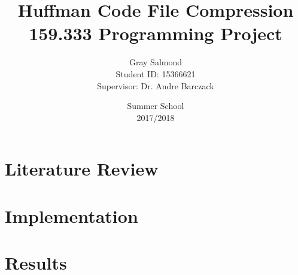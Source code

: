 \documentclass{report}
\title{Huffman Code File Compression\\159.333 Programming Project}
\date{Summer School\\2017/2018}
\author{Gray Salmond\\ Student ID: 15366621\\
Supervisor: Dr. Andre Barczack}
\begin{document}
\maketitle	
{}	
\newpage



\tableofcontents
\newpage


\chapter{Literature Review}




\chapter{Implementation}



\chapter{Results}



 

\end{document}
